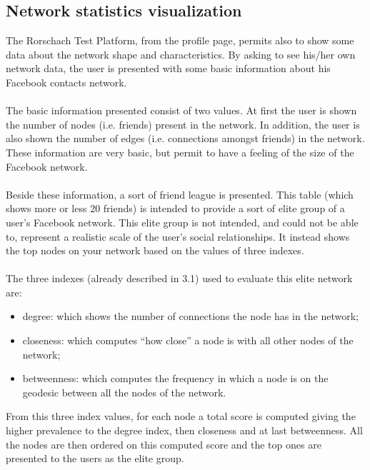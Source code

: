 \subsection{Network statistics visualization}
The Rorschach Test Platform, from the profile page, permits also to show some data about the network shape and characteristics.
By asking to see his/her own network data, the user is presented with some basic information about his Facebook contacts network.\\
\\
The basic information presented consist of two values.
At first the user is shown the number of nodes (i.e. friends) present in the network.
In addition, the user is also shown the number of edges (i.e. connections amongst friends) in the network.
These information are very basic, but permit to have a feeling of the size of the Facebook network.\\
\\
Beside these information, a sort of friend league is presented.
This table (which shows more or less 20 friends) is intended to provide a sort of elite group of a user's Facebook network.
This elite group is not intended, and could not be able to, represent a realistic scale of the user's social relationships.
It instead shows the top nodes on your network based on the values of three indexes.\\
\\
The three indexes (already described in 3.1) used to evaluate this elite network are:
\begin{itemize}
\item degree: which shows the number of connections the node has in the network;
\item closeness: which computes “how close” a node is with all other nodes of the network;
\item betweenness: which computes the frequency in which a node is on the geodesic between all the nodes of the network.
\end{itemize}

From this three index values, for each node a total score is computed giving the higher prevalence to the degree index, then closeness and at last betweenness.
All the nodes are then ordered on this computed score and the top ones are presented to the users as the elite group.

\label{sec:fbintegration}
